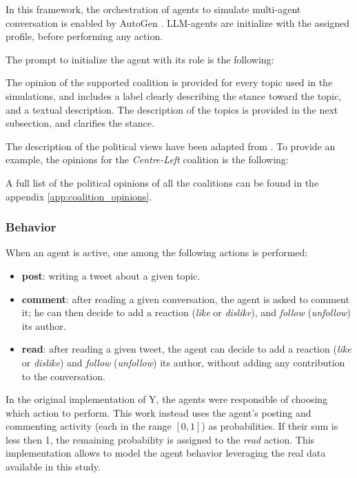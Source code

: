 \medskip
In this framework, the orchestration of agents to simulate multi-agent conversation is enabled by AutoGen \cite{pyautogen0.2.31, wu2023autogenenablingnextgenllm}.
LLM-agents are initialize with the assigned profile, before performing any action. 

The prompt to initialize the agent with its role is the following: 


The opinion of the supported coalition is provided for every topic used in the simulations, and includes a label clearly describing the stance toward the topic, and a textual description.
The description of the topics is provided in the next subsection, and clarifies the stance.

The description of the political views have been adapted from \cite{wired2022elezioni12punti, ilpost2022partiti, pagellapolitica2022confronto, pagellapolitica2022programmi}.
To provide an example, the opinions for the \textit{Centre-Left} coalition is the following:



A full list of the political opinions of all the coalitions can be found in the appendix \ref{app:coalition_opinions}.



\subsubsection{Behavior}
When an agent is active, one among the following actions is performed:
\begin{itemize}
    \item \textbf{post}: writing a tweet about a given topic.
    \item \textbf{comment}: after reading a given conversation, the agent is asked to comment it; he can then decide to add a reaction (\textit{like} or \textit{dislike}), and \textit{follow} (\textit{unfollow}) its author.
    \item \textbf{read}: after reading a given tweet, the agent can decide to add a reaction (\textit{like} or \textit{dislike}) and \textit{follow} (\textit{unfollow}) its author, without adding any contribution to the conversation.
\end{itemize}

\medskip
In the original implementation of Y, the agents were responsible of choosing which action to perform.
This work instead uses the agent's posting and commenting activity (each in the range $[0,1]$) as probabilities. If their sum is less then 1, the remaining probability is assigned to the \textit{read} action.
This implementation allows to model the agent behavior leveraging the real data available in this study.

